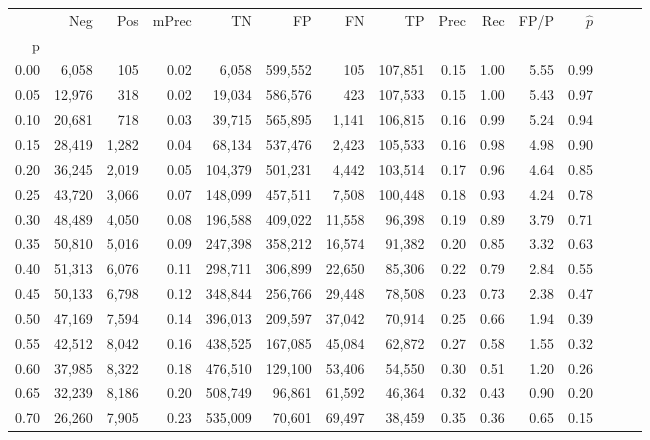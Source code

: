 \begin{tabular}{rrrrrrrrrrrrrrr}
\toprule
{} &     Neg &    Pos & mPrec &       TN &       FP &       FN &       TP &  Prec &   Rec &  FP/P & $\hat{p}$ \\
p    &         &        &       &          &          &          &          &       &       &       &           \\
\midrule
0.00 &   6,058 &    105 &  0.02 &    6,058 &  599,552 &      105 &  107,851 &  0.15 &  1.00 &  5.55 &      0.99 \\
0.05 &  12,976 &    318 &  0.02 &   19,034 &  586,576 &      423 &  107,533 &  0.15 &  1.00 &  5.43 &      0.97 \\
0.10 &  20,681 &    718 &  0.03 &   39,715 &  565,895 &    1,141 &  106,815 &  0.16 &  0.99 &  5.24 &      0.94 \\
0.15 &  28,419 &  1,282 &  0.04 &   68,134 &  537,476 &    2,423 &  105,533 &  0.16 &  0.98 &  4.98 &      0.90 \\
0.20 &  36,245 &  2,019 &  0.05 &  104,379 &  501,231 &    4,442 &  103,514 &  0.17 &  0.96 &  4.64 &      0.85 \\
0.25 &  43,720 &  3,066 &  0.07 &  148,099 &  457,511 &    7,508 &  100,448 &  0.18 &  0.93 &  4.24 &      0.78 \\
0.30 &  48,489 &  4,050 &  0.08 &  196,588 &  409,022 &   11,558 &   96,398 &  0.19 &  0.89 &  3.79 &      0.71 \\
0.35 &  50,810 &  5,016 &  0.09 &  247,398 &  358,212 &   16,574 &   91,382 &  0.20 &  0.85 &  3.32 &      0.63 \\
0.40 &  51,313 &  6,076 &  0.11 &  298,711 &  306,899 &   22,650 &   85,306 &  0.22 &  0.79 &  2.84 &      0.55 \\
0.45 &  50,133 &  6,798 &  0.12 &  348,844 &  256,766 &   29,448 &   78,508 &  0.23 &  0.73 &  2.38 &      0.47 \\
0.50 &  47,169 &  7,594 &  0.14 &  396,013 &  209,597 &   37,042 &   70,914 &  0.25 &  0.66 &  1.94 &      0.39 \\
0.55 &  42,512 &  8,042 &  0.16 &  438,525 &  167,085 &   45,084 &   62,872 &  0.27 &  0.58 &  1.55 &      0.32 \\
0.60 &  37,985 &  8,322 &  0.18 &  476,510 &  129,100 &   53,406 &   54,550 &  0.30 &  0.51 &  1.20 &      0.26 \\
0.65 &  32,239 &  8,186 &  0.20 &  508,749 &   96,861 &   61,592 &   46,364 &  0.32 &  0.43 &  0.90 &      0.20 \\
0.70 &  26,260 &  7,905 &  0.23 &  535,009 &   70,601 &   69,497 &   38,459 &  0.35 &  0.36 &  0.65 &      0.15 \\

\end{tabular}
